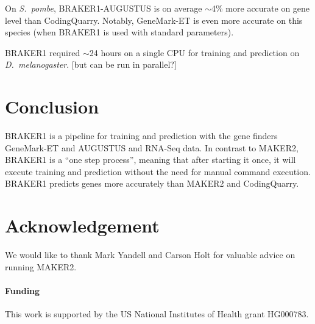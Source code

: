 \documentclass{bioinfo}
\begin{document}
On \textit{S.~pombe}, BRAKER1-AUGUSTUS is on average $\sim$4\% more accurate on gene level than CodingQuarry. Notably, GeneMark-ET is even more accurate on this species (when BRAKER1 is used with standard parameters).

BRAKER1 required $\sim$24 hours on a single CPU for training and prediction on \textit{D.~melanogaster}.
[but can be run in parallel?]

\section{Conclusion}

BRAKER1 is a pipeline for training and prediction with the gene finders GeneMark-ET and AUGUSTUS and RNA-Seq data. In contrast to MAKER2, BRAKER1 is a ``one step process'', meaning that after starting it once, it will execute training and prediction without the need for manual command execution. BRAKER1 predicts genes more accurately than MAKER2 and CodingQuarry.

\section*{Acknowledgement}

We would like to thank Mark Yandell and Carson Holt for valuable advice on running MAKER2.

\paragraph{Funding\textcolon} This work is supported by the US National Institutes of Health grant HG000783.

%
%
%
%
%
%
%
%
%
\end{document}

